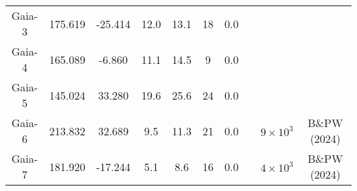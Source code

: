 \begin{table}
\begin{tabular}{cSSSSSSccc}
Gaia-3 & 175.619 & -25.414 & 12.0 & 13.1 & 18 & 0.0 & \citet{malhan:2018} & &  \\
Gaia-4 & 165.089 & -6.860 & 11.1 & 14.5 & 9 & 0.0 & \citet{malhan:2018} & &  \\
Gaia-5 & 145.024 & 33.280 & 19.6 & 25.6 & 24 & 0.0 & \citet{malhan:2018} & &  \\
Gaia-6 & 213.832 & 32.689 & 9.5 & 11.3 & 21 & 0.0 & \citet{ibata:2023} & $9 \times 10^{3}$ & B\&PW (2024) \\
Gaia-7 & 181.920 & -17.244 & 5.1 & 8.6 & 16 & 0.0 & \citet{ibata:2023} & $4 \times 10^{3}$ & B\&PW (2024) \\
\hline \hline
\end{tabular}
\end{table}
